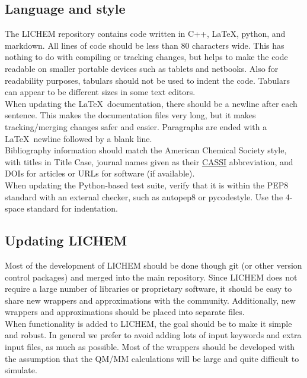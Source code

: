 \documentclass[12pt]{report}
\begin{document}
\subsection{Language and style}

The LICHEM repository contains code written in C++, \LaTeX, python,
and markdown.
All lines of code should be less than 80 characters wide.
This has nothing to do with compiling or tracking changes, but helps to make
the code readable on smaller portable devices such as tablets and netbooks.
Also for readability purposes, tabulars should not be used to indent the code.
Tabulars can appear to be different sizes in some text editors. \\

When updating the \LaTeX\ documentation, there should be a newline after each
sentence.
This makes the documentation files very long, but it makes tracking/merging
changes safer and easier.
Paragraphs are ended with a \LaTeX\ newline followed by a blank line. \\

Bibliography information should match the American Chemical Society style,
with titles in Title Case, journal names given as their
\href{https://cassi.cas.org/search.jsp}{CASSI} abbreviation,
and DOIs for articles or URLs for software (if available). \\

When updating the Python-based test suite, verify that it is within the PEP8
standard with an external checker, such as autopep8 or pycodestyle.
Use the 4-space standard for indentation.

\subsection{Updating LICHEM}

Most of the development of LICHEM should be done though git (or other version
control packages) and merged into the main repository.
Since LICHEM does not require a large number of libraries or proprietary
software, it should be easy to share new wrappers and approximations with the
community.
Additionally, new wrappers and approximations should be placed into separate
files. \\

When functionality is added to LICHEM, the goal should be to make it simple
and robust.
In general we prefer to avoid adding lots of input keywords and extra input
files, as much as possible.
Most of the wrappers should be developed with the assumption that the QM/MM
calculations will be large and quite difficult to simulate.\\
\end{document}
